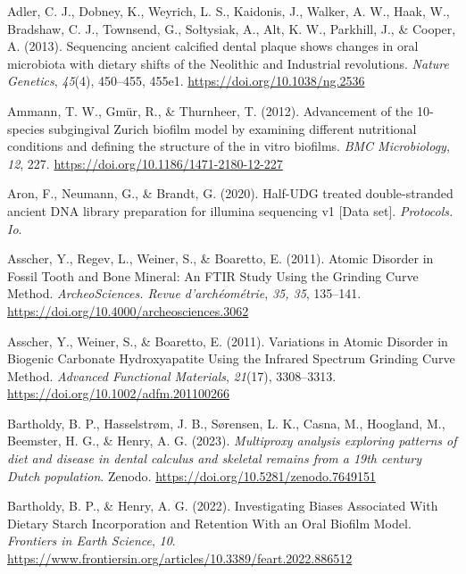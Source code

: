 \documentclass[
  letterpaper,
]{book}
\newlength{\cslhangindent}
\newlength{\cslentryspacingunit} %
\newenvironment{CSLReferences}[2] %
 {%
  \setlength{\parindent}{0pt}
  \ifodd #1
  \let\oldpar\par
  \def\par{\hangindent=\cslhangindent\oldpar}
  \fi
  \setlength{\parskip}{#2\cslentryspacingunit}
 }%
 {}
\begin{document}
\hypertarget{refs-3}{}
\begin{CSLReferences}{1}{0}
\leavevmode{}%
Adler, C. J., Dobney, K., Weyrich, L. S., Kaidonis, J., Walker, A. W.,
Haak, W., Bradshaw, C. J., Townsend, G., Sołtysiak, A., Alt, K. W.,
Parkhill, J., \& Cooper, A. (2013). Sequencing ancient calcified dental
plaque shows changes in oral microbiota with dietary shifts of the
{Neolithic} and {Industrial} revolutions. \emph{Nature Genetics},
\emph{45}(4), 450--455, 455e1. \url{https://doi.org/10.1038/ng.2536}

\leavevmode{}%
Ammann, T. W., Gmür, R., \& Thurnheer, T. (2012). Advancement of the
10-species subgingival {Zurich} biofilm model by examining different
nutritional conditions and defining the structure of the in vitro
biofilms. \emph{BMC Microbiology}, \emph{12}, 227.
\url{https://doi.org/10.1186/1471-2180-12-227}

\leavevmode{}%
Aron, F., Neumann, G., \& Brandt, G. (2020). Half-{UDG} treated
double-stranded ancient {DNA} library preparation for illumina
sequencing v1 {[}{Data} set{]}. \emph{Protocols. Io}.

\leavevmode{}%
Asscher, Y., Regev, L., Weiner, S., \& Boaretto, E. (2011). Atomic
{Disorder} in {Fossil Tooth} and {Bone Mineral}: {An FTIR Study Using}
the {Grinding Curve Method}. \emph{ArcheoSciences. Revue
d'archéométrie}, \emph{35, 35}, 135--141.
\url{https://doi.org/10.4000/archeosciences.3062}

\leavevmode{}%
Asscher, Y., Weiner, S., \& Boaretto, E. (2011). Variations in {Atomic
Disorder} in {Biogenic Carbonate Hydroxyapatite Using} the {Infrared
Spectrum Grinding Curve Method}. \emph{Advanced Functional Materials},
\emph{21}(17), 3308--3313. \url{https://doi.org/10.1002/adfm.201100266}

\leavevmode{}%
Bartholdy, B. P., Hasselstrøm, J. B., Sørensen, L. K., Casna, M.,
Hoogland, M., Beemster, H. G., \& Henry, A. G. (2023). \emph{Multiproxy
analysis exploring patterns of diet and disease in dental calculus and
skeletal remains from a 19th century {Dutch} population}. {Zenodo}.
\url{https://doi.org/10.5281/zenodo.7649151}

\leavevmode{}%
Bartholdy, B. P., \& Henry, A. G. (2022). Investigating {Biases
Associated With Dietary Starch Incorporation} and {Retention With} an
{Oral Biofilm Model}. \emph{Frontiers in Earth Science}, \emph{10}.
\url{https://www.frontiersin.org/articles/10.3389/feart.2022.886512}


\end{CSLReferences}
\end{document}
